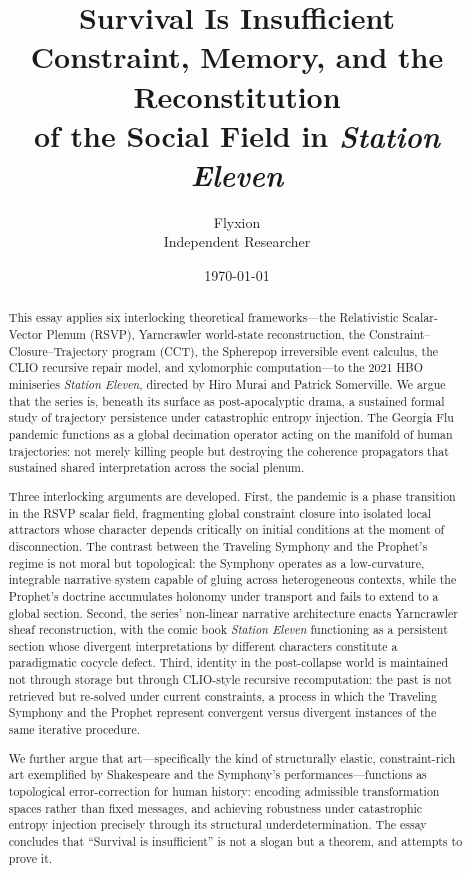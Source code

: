 \documentclass[12pt, oneside]{article}
\title{%
  \textbf{Survival Is Insufficient}\\[0.4em]
  {\large Constraint, Memory, and the Reconstitution\\
  of the Social Field in \textit{Station Eleven}}
}
\author{Flyxion\\[0.3em]{\small Independent Researcher}}
\date{\today}
\theoremstyle{plain}
\theoremstyle{definition}
\theoremstyle{remark}
\begin{document}

\maketitle
\thispagestyle{empty}

\begin{abstract}
This essay applies six interlocking theoretical frameworks---the
Relativistic Scalar-Vector Plenum (RSVP), Yarncrawler world-state
reconstruction, the Constraint--Closure--Trajectory program (CCT),
the Spherepop irreversible event calculus, the CLIO recursive repair
model, and xylomorphic computation---to the 2021 HBO miniseries
\textit{Station Eleven}, directed by Hiro Murai and Patrick
Somerville. We argue that the series is, beneath its surface as
post-apocalyptic drama, a sustained formal study of trajectory
persistence under catastrophic entropy injection. The Georgia Flu
pandemic functions as a global decimation operator acting on the
manifold of human trajectories: not merely killing people but
destroying the coherence propagators that sustained shared
interpretation across the social plenum.

Three interlocking arguments are developed. First, the pandemic is
a phase transition in the RSVP scalar field, fragmenting global
constraint closure into isolated local attractors whose character
depends critically on initial conditions at the moment of
disconnection. The contrast between the Traveling Symphony and the
Prophet's regime is not moral but topological: the Symphony operates
as a low-curvature, integrable narrative system capable of gluing
across heterogeneous contexts, while the Prophet's doctrine
accumulates holonomy under transport and fails to extend to a global
section. Second, the series' non-linear narrative architecture
enacts Yarncrawler sheaf reconstruction, with the comic book
\textit{Station Eleven} functioning as a persistent section whose
divergent interpretations by different characters constitute a
paradigmatic cocycle defect. Third, identity in the post-collapse
world is maintained not through storage but through CLIO-style
recursive recomputation: the past is not retrieved but re-solved
under current constraints, a process in which the Traveling Symphony
and the Prophet represent convergent versus divergent instances of
the same iterative procedure.

We further argue that art---specifically the kind of
structurally elastic, constraint-rich art exemplified by Shakespeare
and the Symphony's performances---functions as topological
error-correction for human history: encoding admissible
transformation spaces rather than fixed messages, and achieving
robustness under catastrophic entropy injection precisely through
its structural underdetermination. The essay concludes that
``Survival is insufficient'' is not a slogan but a theorem, and
attempts to prove it.
\end{abstract}
\end{document}
